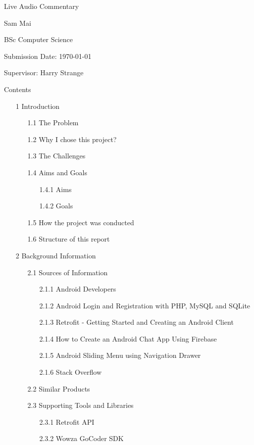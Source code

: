 \documentclass{article}
\begin{document}
\begin{center}
{\Huge Live Audio Commentary\\[5cm]}

{\Large Sam Mai

BSc Computer Science

Submission Date: \today

Supervisor: Harry Strange}
\end{center}
\newpage
Contents
\begin{itemize}
    	\item [1] Introduction
	\begin{itemize}
		\item [1.1] The Problem
		\item [1.2] Why I chose this project?
		\item [1.3] The Challenges
		\item [1.4] Aims and Goals
		\begin{itemize}
			\item [1.4.1] Aims
			\item [1.4.2] Goals
		\end{itemize}
		\item [1.5] How the project was conducted
		\item [1.6] Structure of this report
	\end{itemize}
    	\item [2] Background Information
	\begin{itemize}
		\item [2.1] Sources of Information
		\begin{itemize}
			\item [2.1.1] Android Developers
			\item [2.1.2] Android Login and Registration with PHP, MySQL and SQLite
			\item [2.1.3] Retrofit - Getting Started and Creating an Android Client
			\item [2.1.4] How to Create an Android Chat App Using Firebase
			\item [2.1.5] Android Sliding Menu using Navigation Drawer
			\item [2.1.6] Stack Overflow
		\end{itemize}
		\item [2.2] Similar Products
		\item [2.3] Supporting Tools and Libraries
		\begin{itemize}
			\item [2.3.1] Retrofit API
			\item [2.3.2] Wowza GoCoder SDK

\end{itemize}
\end{itemize}
\end{itemize}
\end{document}
